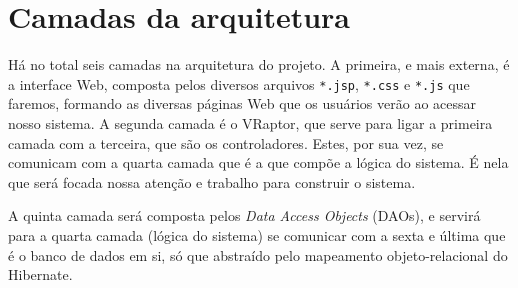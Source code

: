 \documentclass[11pt, a4paper]{article}
\begin{document}
    \section{Camadas da arquitetura}
        Há no total seis camadas na arquitetura do projeto. A primeira, e mais
        externa, é a interface Web, composta pelos diversos arquivos
        \texttt{*.jsp}, \texttt{*.css} e \texttt{*.js} que faremos, formando as 
		diversas páginas Web que os usuários verão ao acessar nosso sistema.
        A segunda camada é o VRaptor, que serve para ligar a primeira camada com
        a terceira, que são os controladores. Estes, por sua vez, se comunicam
        com a quarta camada que é a que compõe a lógica do sistema. É nela que
        será focada nossa atenção e trabalho para construir o sistema.

        A quinta camada será composta pelos \textit{Data Access Objects} (DAOs),
        e servirá para a quarta camada (lógica do sistema) se comunicar com a
        sexta e última que é o banco de dados em si, só que abstraído pelo
        mapeamento objeto-relacional do Hibernate.
\end{document}
